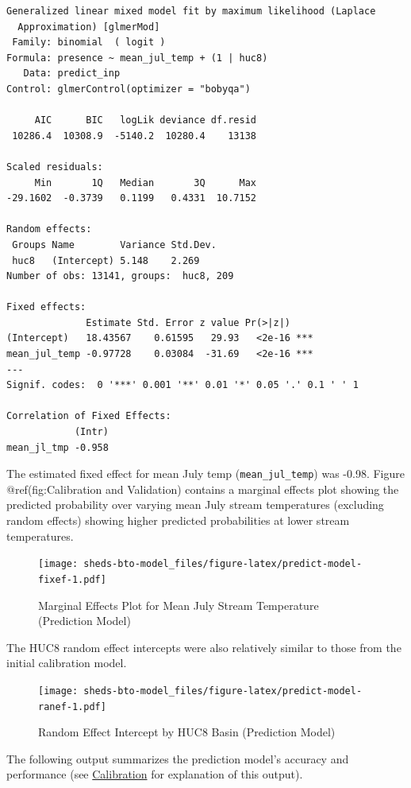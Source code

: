 \documentclass[
]{book}
\begin{document}
\begin{verbatim}
Generalized linear mixed model fit by maximum likelihood (Laplace
  Approximation) [glmerMod]
 Family: binomial  ( logit )
Formula: presence ~ mean_jul_temp + (1 | huc8)
   Data: predict_inp
Control: glmerControl(optimizer = "bobyqa")

     AIC      BIC   logLik deviance df.resid 
 10286.4  10308.9  -5140.2  10280.4    13138 

Scaled residuals: 
     Min       1Q   Median       3Q      Max 
-29.1602  -0.3739   0.1199   0.4331  10.7152 

Random effects:
 Groups Name        Variance Std.Dev.
 huc8   (Intercept) 5.148    2.269   
Number of obs: 13141, groups:  huc8, 209

Fixed effects:
              Estimate Std. Error z value Pr(>|z|)    
(Intercept)   18.43567    0.61595   29.93   <2e-16 ***
mean_jul_temp -0.97728    0.03084  -31.69   <2e-16 ***
---
Signif. codes:  0 '***' 0.001 '**' 0.01 '*' 0.05 '.' 0.1 ' ' 1

Correlation of Fixed Effects:
            (Intr)
mean_jl_tmp -0.958
\end{verbatim}

The estimated fixed effect for mean July temp (\texttt{mean\_jul\_temp}) was -0.98. Figure @ref(fig:Calibration and Validation) contains a marginal effects plot showing the predicted probability over varying mean July stream temperatures (excluding random effects) showing higher predicted probabilities at lower stream temperatures.

\begin{figure}
\centering
\texttt{[image: sheds-bto-model\_files/figure-latex/predict-model-fixef-1.pdf]}
\caption{\label{fig:predict-model-fixef}Marginal Effects Plot for Mean July Stream Temperature (Prediction Model)}
\end{figure}

The HUC8 random effect intercepts were also relatively similar to those from the initial calibration model.

\begin{figure}
\centering
\texttt{[image: sheds-bto-model\_files/figure-latex/predict-model-ranef-1.pdf]}
\caption{\label{fig:predict-model-ranef}Random Effect Intercept by HUC8 Basin (Prediction Model)}
\end{figure}

The following output summarizes the prediction model's accuracy and performance (see \protect\hyperlink{calibration}{Calibration} for explanation of this output).
\end{document}
